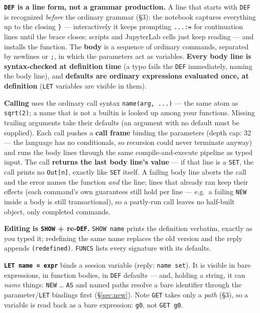 \documentclass[11pt]{article}
\newcommand{\kw}[1]{\texttt{\uppercase{#1}}}
\newcommand{\code}[1]{\texttt{#1}}
\begin{document}
\textbf{\kw{def} is a line form, not a grammar production.} A line
that starts with \code{DEF } is recognized \emph{before} the ordinary
grammar (\S3): the notebook captures everything up to the closing
\code{\}} --- interactively it keeps prompting \code{...:=} for
continuation lines until the brace closes; scripts and JupyterLab
cells just keep reading --- and installs the function. The
\textbf{body} is a sequence of ordinary commands, separated by
newlines or \code{;}, in which the parameters act as variables.
\textbf{Every body line is syntax-checked at definition time} (a typo
fails the \kw{def} immediately, naming the body line), and
\textbf{defaults are ordinary expressions evaluated once, at
definition} (\kw{let} variables are visible in them).

\textbf{Calling} uses the ordinary call syntax \code{name(arg, ...)}
--- the same atom as \code{sqrt(2)}; a name that is not a builtin is
looked up among your functions. Missing trailing arguments take their
defaults (an argument with no default must be supplied). Each call
pushes a \textbf{call frame} binding the parameters (depth cap: 32
--- the language has no conditionals, so recursion could never
terminate anyway) and runs the body lines through the same
compile-and-execute pipeline as typed input. The call \textbf{returns
the last body line's value} --- if that line is a \kw{set}, the call
prints no \code{Out[n]}, exactly like \kw{set} itself. A failing body
line aborts the call and the error names the function \emph{and} the
line; lines that already ran keep their effects (each command's own
guarantees still hold per line --- e.g.\ a failing \kw{new} inside a
body is still transactional), so a partly-run call leaves no
half-built object, only completed commands.

\textbf{Editing is \kw{show} + re-\kw{def}.} \code{SHOW name} prints
the definition verbatim, exactly as you typed it; redefining the same
name replaces the old version and the reply appends
\code{(redefined)}. \kw{funcs} lists every signature with its
defaults.

\textbf{\code{LET name = expr}} binds a session variable (reply:
\code{name set}). It is visible in bare expressions, in function
bodies, in \kw{def} defaults --- and, holding a string, it can
\emph{name} things: \kw{new} \ldots{} \kw{as} and named paths resolve
a bare identifier through the parameter/\kw{let} bindings first
(\S\ref{sec:new}). Note \kw{get} takes only a \emph{path} (\S3), so a
variable is read back as a bare expression: \code{g0}, not
\code{GET g0}.
\end{document}
